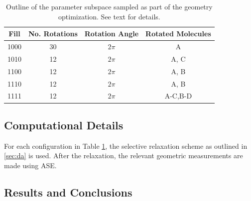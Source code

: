         \begin{table}[]
            \centering
            \begin{tabular}{c|c|c|c}
                Fill & No. Rotations & Rotation Angle  & Rotated Molecules  \\
                \hline
                \hline
                1000 & 30 & $2\pi$ & A \\
                1010 & 12 & $2\pi$ & A, C \\
                1100 & 12 & $2\pi$ & A, B \\
                1110 & 12 & $2\pi$ & A, B \\
                1111 & 12 & $2\pi$ & A-C,B-D \\
            \end{tabular}
            \caption{Outline of the parameter subspace sampled as part of the geometry optimization. See text for details.}
            \label{tab:param_subspace}
        \end{table}
        
        \subsection{Computational Details}
        
        For each configuration in Table \ref{tab:param_subspace}, the selective relaxation scheme as outlined in \ref{sec:da} is used. After the relaxation, the relevant geometric measurements are made using ASE. 
        
        \subsection{Results and Conclusions}
        \label{sec:geom_opt}
        
